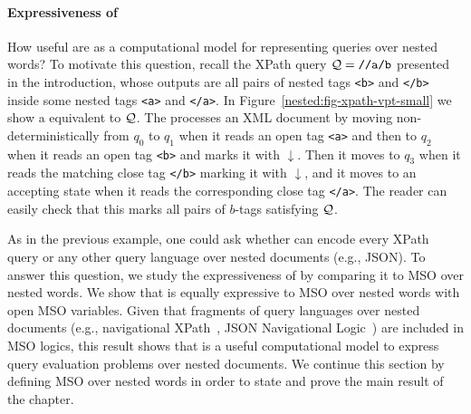 \paragraph{Expressiveness of \vpannnames} How useful are \vpann as a computational model for representing queries over nested words? To motivate this question, recall the XPath query $\mathcal{Q} = \texttt{//a/b}$ presented in the introduction, whose outputs are all pairs of nested tags \texttt{<b>} and \texttt{</b>} inside some nested tags \texttt{<a>} and \texttt{</a>}. In Figure~\ref{nested:fig-xpath-vpt-small} we show a \vpann equivalent to $\mathcal{Q}$. The \vpann processes an XML document by moving non-deterministically from $q_0$ to $q_1$ when it reads an open tag \texttt{<a>} and then to $q_2$ when it reads an open tag \texttt{<b>} and marks it with $\downarrow$. Then it moves to $q_3$ when it reads the matching close tag \texttt{</b>} marking it with $\downarrow$, and it moves to an accepting state when it reads the corresponding close tag \texttt{</a>}. The reader can easily check that this \vpann marks all pairs of $b$-tags satisfying $\mathcal{Q}$.  



As in the previous example, one could ask whether \vpann can encode every XPath query or any other query language over nested documents (e.g., JSON). To answer this question, we study the expressiveness of \vpann by comparing it to MSO over nested words. We show that \vpann is equally expressive to MSO over nested words with 
open MSO variables. Given that fragments of query languages over nested documents (e.g., navigational XPath~\cite{CateM07}, JSON Navigational Logic~\cite{BourhisRV20}) are included in MSO logics, this result shows that \vpann is a useful computational model to express query evaluation problems over nested documents. We continue this section by defining MSO over nested words in order to state and prove the main result of the chapter.


